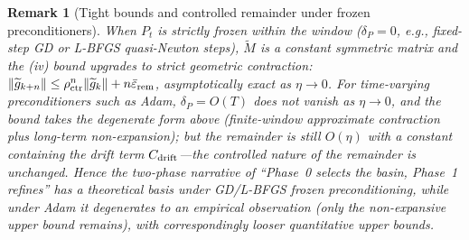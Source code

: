 \documentclass[11pt]{article}
\newcommand{\wt}[1]{\widetilde{#1}}
\newtheorem*{remark}{Remark}
\numberwithin{equation}{section}
\begin{document}
\begin{remark}[Tight bounds and controlled remainder under frozen preconditioners]\label{rem:linrec-frozen}
When $P_t$ is strictly frozen within the window ($\delta_P=0$, e.g., fixed-step GD or L-BFGS quasi-Newton steps), $\wt M$ is a constant symmetric matrix and the (iv) bound upgrades to \emph{strict geometric contraction}: $\|\wt g_{k+n}\|\le\rho_{\rm ctr}^n\|\wt g_k\|+n\bar\varepsilon_{\rm rem}$, asymptotically exact as $\eta\to0$. For time-varying preconditioners such as Adam, $\delta_P=O(T)$ does not vanish as $\eta\to0$, and the bound takes the degenerate form above (finite-window approximate contraction plus long-term non-expansion); but the remainder is still $O(\eta)$ with a constant containing the drift term $C_{\rm drift}$---\emph{the controlled nature of the remainder is unchanged}. Hence the two-phase narrative of ``Phase~0 selects the basin, Phase~1 refines'' has a theoretical basis under GD/L-BFGS frozen preconditioning, while under Adam it degenerates to an empirical observation (only the non-expansive upper bound remains), with correspondingly looser quantitative upper bounds.
\end{remark}
\end{document}
